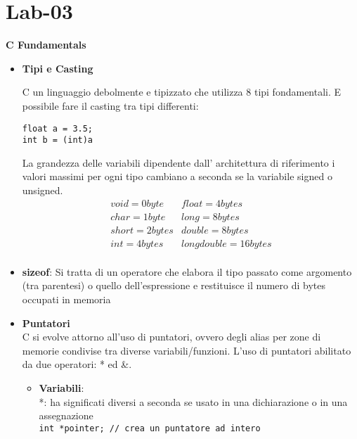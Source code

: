 \section{Lab-03}
\begin{flushleft}
  \textbf{C Fundamentals}\par 
  \begin{itemize}
    \item \textbf{Tipi e Casting}\par 
          C \ace un linguaggio debolmente e tipizzato che utilizza 8 tipi 
          fondamentali. \ac{E} possibile fare il casting tra tipi 
          differenti: 
          \begin{flushleft}
            \texttt{float a = 3.5; \\
                    int b = (int)a}
          \end{flushleft}
          La grandezza delle variabili \ace dipendente dall'
          architettura di riferimento i valori massimi per ogni 
          tipo cambiano a seconda se la variabile \ace signed o unsigned.
          $$\begin{array}{l|l}
            void = 0 byte & float = 4 bytes \\
            char = 1 byte & long = 8 bytes\\
            short = 2 bytes & double = 8 bytes \\
            int = 4 bytes & long double = 16 bytes \\
          \end{array}$$
    \item \textbf{sizeof}: Si tratta di un operatore che elabora il tipo passato come argomento (tra parentesi) o 
    quello dell’espressione e restituisce il numero di bytes occupati in memoria
    \item \textbf{Puntatori}\\
          C si evolve attorno all'uso di puntatori, ovvero degli 
          alias per zone di memorie condivise tra diverse 
          variabili/funzioni. L'uso di puntatori \ace abilitato da 
          due operatori: * ed \&.
          \begin{itemize}
            \item \textbf{Variabili}:\\
                  *: ha significati diversi a seconda se usato in una dichiarazione 
                  o in una assegnazione\\
                  \texttt{int *pointer; // crea un puntatore ad intero \\
}
\end{itemize}
\end{itemize}
\end{flushleft}

